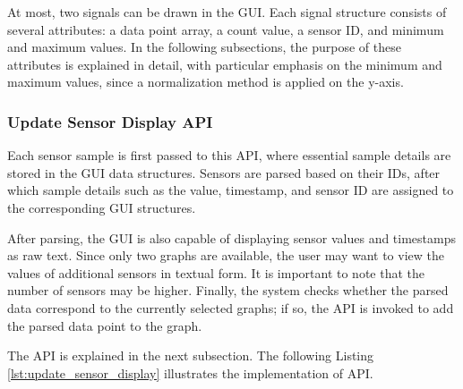 At most, two signals can be drawn in the GUI. Each signal structure consists of several 
attributes: a data point array, a count value, a sensor ID, and minimum and maximum 
values. In the following subsections, the purpose of these attributes is explained in 
detail, with particular emphasis on the minimum and maximum values, since a normalization 
method is applied on the y-axis.

\subsubsection{Update Sensor Display API}

Each sensor sample is first passed to this API, where essential sample details are 
stored in the GUI data structures. Sensors are parsed based on their IDs, after which 
sample details such as the value, timestamp, and sensor ID are assigned to the 
corresponding GUI structures.

After parsing, the GUI is also capable of displaying sensor values and timestamps as 
raw text. Since only two graphs are available, the user may want to view the values of 
additional sensors in textual form. It is important to note that the number of sensors 
may be higher. Finally, the system checks whether the parsed data correspond to the 
currently selected graphs; if so, the   API is invoked to add the 
parsed data point to the graph.

The  API is explained in the next subsection. The 
following Listing \ref{lst:update_sensor_display} illustrates the implementation of  API.


